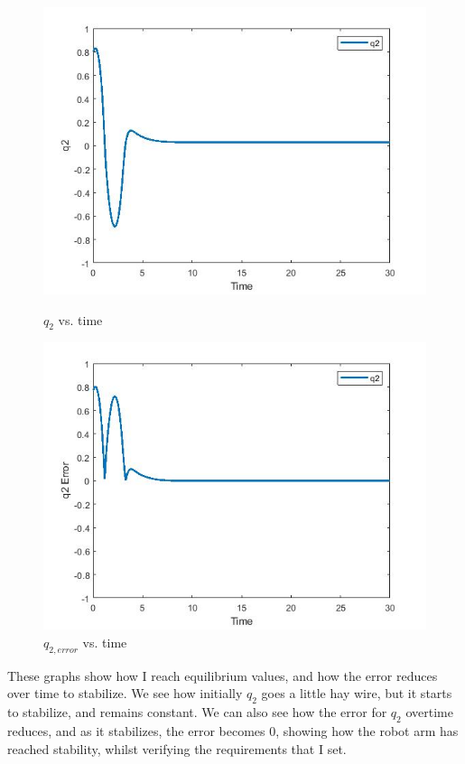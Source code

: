 \documentclass[12pt]{article}
\begin{document}
\begin{figure}[H]
\centering
\begin{minipage}{.4\textwidth}
	\centering
	\includegraphics[width=.97\linewidth]{q2 vs time.jpg}
	\caption{$q_{2}$ vs. time}
	\end{minipage}%
\begin{minipage}{.4\textwidth}
	\centering
	\includegraphics[width=.97\linewidth]{q2 error.jpg}
	\caption{$q_{2,error}$ vs. time}
\end{minipage}
\end{figure}
These graphs show how I reach equilibrium values, and how the error reduces over time to stabilize. We see how initially $q_{2}$ goes a little hay wire, but it starts to stabilize, and remains constant. We can also see how the error for $q_{2}$ overtime reduces, and as it stabilizes, the error becomes 0, showing how the robot arm has reached stability, whilst verifying the requirements that I set.\\ 
\end{document}
